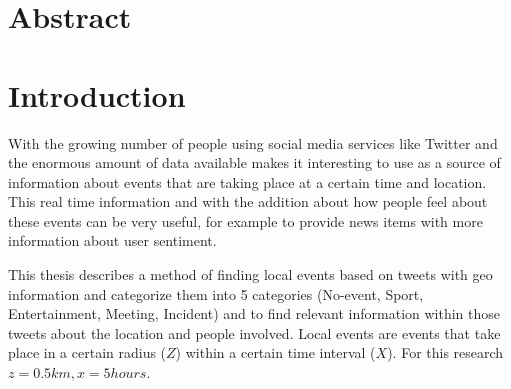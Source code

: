 \documentclass[
10pt, %
a4paper, %
oneside, %
headinclude,footinclude, %
BCOR5mm, %
]{scrartcl}
\begin{document}


\clearpage
\section*{Abstract} %

\lipsum[1] %



\newpage %


\section{Introduction}

With the growing number of people using social media services like Twitter and the enormous amount of data available makes it interesting to use as a source of information about events that are taking place at a certain time and location. This real time information and with the addition about how people feel about these events can be very useful, for example to provide news items with more information about user sentiment.

This thesis describes a method of finding local events based on tweets with geo information and categorize them into 5 categories (No-event, Sport, Entertainment, Meeting, Incident) and to find relevant information within those tweets about the location and people involved. Local events are events that take place in a certain radius (\begin{math}Z\end{math}) within a certain time interval (\begin{math}X\end{math}). For this research \begin{math}z= 0.5km , x= 5 hours\end{math}.
\end{document}
